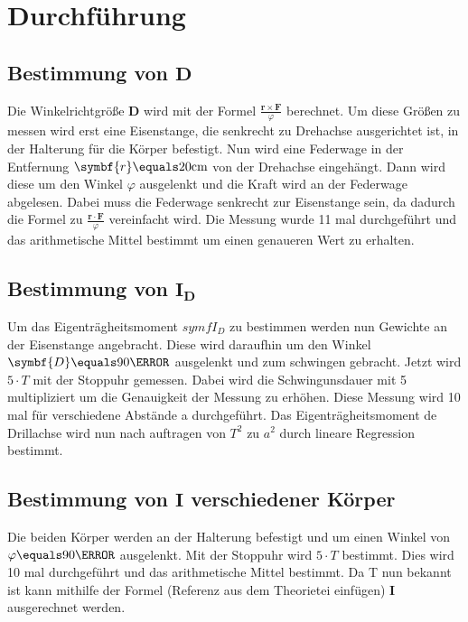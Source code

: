 \section{Durchführung}
\label{sec:Durchführung}
    \subsection{Bestimmung von $\symbf{D}$}
    Die Winkelrichtgröße $\symbf{D}$ wird mit der Formel $\frac{\symbf{r}\times\symbf{F}}{\varphi}$ berechnet.
    Um diese Größen zu messen wird erst eine Eisenstange, die senkrecht zu Drehachse ausgerichtet ist, in der Halterung für die Körper befestigt.
    Nun wird eine Federwage in der Entfernung $\symbf{r}\equals20\unit{\centi\meter}$ von der Drehachse eingehängt.
    Dann wird diese um den Winkel $\varphi$ ausgelenkt und die Kraft wird an der Federwage abgelesen.
    Dabei muss die Federwage senkrecht zur Eisenstange sein, da dadurch die Formel zu $\frac{\symbf{r}\cdot\symbf{F}}{\varphi}$ vereinfacht wird.
    Die Messung wurde 11 mal durchgeführt und das arithmetische Mittel bestimmt um einen genaueren Wert zu erhalten.

    \subsection{Bestimmung von $\symbf{I_D}$}
    Um das Eigenträgheitsmoment $symf{I_D}$ zu bestimmen werden nun Gewichte an der Eisenstange angebracht. 
    Diese wird daraufhin um den Winkel $\symbf{D}\equals90\degree$ ausgelenkt und zum schwingen gebracht.
    Jetzt wird $5 \cdot T$ mit der Stoppuhr gemessen. 
    Dabei wird die Schwingunsdauer mit 5 multipliziert um die Genauigkeit der Messung zu erhöhen. 
    Diese Messung wird 10 mal für verschiedene Abstände a durchgeführt.
    Das Eigenträgheitsmoment de Drillachse wird nun nach auftragen von $T^2$ zu $a^2$ durch lineare Regression bestimmt.

    \subsection{Bestimmung von $\symbf{I}$ verschiedener Körper}
    Die beiden Körper werden an der Halterung befestigt und um einen Winkel von $\varphi\equals90\degree$ ausgelenkt.
    Mit der Stoppuhr wird $5 \cdot T$ bestimmt. 
    Dies wird 10 mal durchgeführt und das arithmetische Mittel bestimmt.
    Da T nun bekannt ist kann mithilfe der Formel (Referenz aus dem Theorietei einfügen) $\symbf{I}$ ausgerechnet werden.

